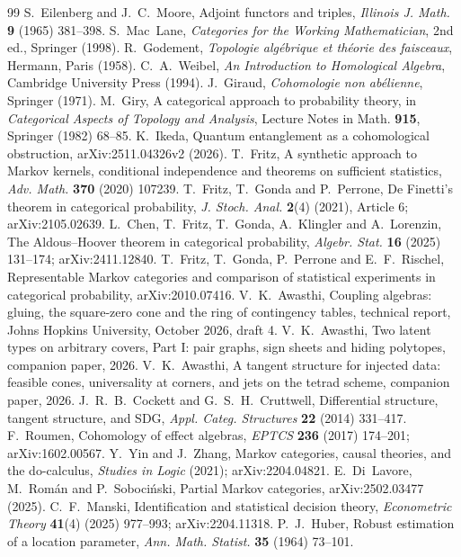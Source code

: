 \documentclass[11pt]{article}
\theoremstyle{definition}\newtheorem{definition}{Definition}\newtheorem{remark}{Remark}
\begin{document}
\begin{thebibliography}{99}
 S.~Eilenberg and J.~C.~Moore, Adjoint functors and triples, \emph{Illinois J. Math.} \textbf{9} (1965) 381--398.
 S.~Mac~Lane, \emph{Categories for the Working Mathematician}, 2nd ed., Springer (1998).
 R.~Godement, \emph{Topologie algébrique et théorie des faisceaux}, Hermann, Paris (1958).
 C.~A.~Weibel, \emph{An Introduction to Homological Algebra}, Cambridge University Press (1994).
 J.~Giraud, \emph{Cohomologie non abélienne}, Springer (1971).
 M.~Giry, A categorical approach to probability theory, in \emph{Categorical Aspects of Topology and Analysis}, Lecture Notes in Math. \textbf{915}, Springer (1982) 68--85.
 K.~Ikeda, Quantum entanglement as a cohomological obstruction, arXiv:2511.04326v2 (2026).
 T.~Fritz, A synthetic approach to Markov kernels, conditional independence and theorems on sufficient statistics, \emph{Adv. Math.} \textbf{370} (2020) 107239.
 T.~Fritz, T.~Gonda and P.~Perrone, De Finetti's theorem in categorical probability, \emph{J. Stoch. Anal.} \textbf{2}(4) (2021), Article 6; arXiv:2105.02639.
 L.~Chen, T.~Fritz, T.~Gonda, A.~Klingler and A.~Lorenzin, The Aldous--Hoover theorem in categorical probability, \emph{Algebr. Stat.} \textbf{16} (2025) 131--174; arXiv:2411.12840.
 T.~Fritz, T.~Gonda, P.~Perrone and E.~F.~Rischel, Representable Markov categories and comparison of statistical experiments in categorical probability, arXiv:2010.07416.
 V.~K.~Awasthi, Coupling algebras: gluing, the square-zero cone and the ring of contingency tables, technical report, Johns Hopkins University, October 2026, draft 4.
 V.~K.~Awasthi, Two latent types on arbitrary covers, Part I: pair graphs, sign sheets and hiding polytopes, companion paper, 2026.
 V.~K.~Awasthi, A tangent structure for injected data: feasible cones, universality at corners, and jets on the tetrad scheme, companion paper, 2026.
 J.~R.~B.~Cockett and G.~S.~H.~Cruttwell, Differential structure, tangent structure, and SDG, \emph{Appl. Categ. Structures} \textbf{22} (2014) 331--417.
 F.~Roumen, Cohomology of effect algebras, \emph{EPTCS} \textbf{236} (2017) 174--201; arXiv:1602.00567.
 Y.~Yin and J.~Zhang, Markov categories, causal theories, and the do-calculus, \emph{Studies in Logic} (2021); arXiv:2204.04821.
 E.~Di~Lavore, M.~Román and P.~Sobociński, Partial Markov categories, arXiv:2502.03477 (2025).
 C.~F.~Manski, Identification and statistical decision theory, \emph{Econometric Theory} \textbf{41}(4) (2025) 977--993; arXiv:2204.11318.
 P.~J.~Huber, Robust estimation of a location parameter, \emph{Ann. Math. Statist.} \textbf{35} (1964) 73--101.


\end{thebibliography}
\end{document}
